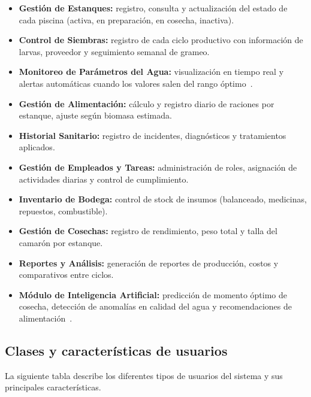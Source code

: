 \documentclass[11pt,a4paper]{article}
\begin{document}
\begin{itemize}
    \item \textbf{Gestión de Estanques:} registro, consulta y actualización del estado de cada piscina (activa, en preparación, en cosecha, inactiva).
    
    \item \textbf{Control de Siembras:} registro de cada ciclo productivo con información de larvas, proveedor y seguimiento semanal de grameo.
    
    \item \textbf{Monitoreo de Parámetros del Agua:} visualización en tiempo real y alertas automáticas cuando los valores salen del rango óptimo~\cite{aquaculture_iot_2022}.
    
    \item \textbf{Gestión de Alimentación:} cálculo y registro diario de raciones por estanque, ajuste según biomasa estimada.
    
    \item \textbf{Historial Sanitario:} registro de incidentes, diagnósticos y tratamientos aplicados.
    
    \item \textbf{Gestión de Empleados y Tareas:} administración de roles, asignación de actividades diarias y control de cumplimiento.
    
    \item \textbf{Inventario de Bodega:} control de stock de insumos (balanceado, medicinas, repuestos, combustible).
    
    \item \textbf{Gestión de Cosechas:} registro de rendimiento, peso total y talla del camarón por estanque.
    
    \item \textbf{Reportes y Análisis:} generación de reportes de producción, costos y comparativos entre ciclos.
    
    \item \textbf{Módulo de Inteligencia Artificial:} predicción de momento óptimo de cosecha, detección de anomalías en calidad del agua y recomendaciones de alimentación~\cite{ai_aquaculture_2023}.
\end{itemize}

\subsection{Clases y características de usuarios}
La siguiente tabla describe los diferentes tipos de usuarios del sistema y sus principales características.
\end{document}
